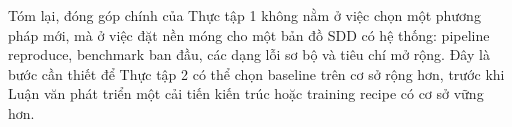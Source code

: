 Tóm lại, đóng góp chính của Thực tập 1 không nằm ở việc chọn một phương pháp mới, mà ở việc đặt nền móng cho một bản đồ SDD có hệ thống: pipeline reproduce, benchmark ban đầu, các dạng lỗi sơ bộ và tiêu chí mở rộng. Đây là bước cần thiết để Thực tập 2 có thể chọn baseline trên cơ sở rộng hơn, trước khi Luận văn phát triển một cải tiến kiến trúc hoặc training recipe có cơ sở vững hơn.
